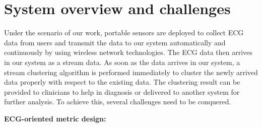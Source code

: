 \documentclass[conference]{IEEEtran}
\begin{document}
%



\section{System overview and challenges}
Under the scenario of our work, portable sensors are deployed to collect ECG data from users and transmit the data to our system automatically and continuously by using wireless network technologies. The ECG data then arrives in our system as a stream data. As soon as the data arrives in our system, a stream clustering algorithm is performed immediately to cluster the newly arrived data properly with respect to the existing data. The clustering result can be provided to clinicians to help in diagnosis or delivered to another system for further analysis. To achieve this, several challenges need to be conquered.


\textbf{ECG-oriented metric design:}
\end{document}
